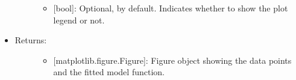\documentclass[letterpaper,10pt,english]{sphinxmanual}
\begin{document}
\begin{fulllineitems}
\begin{fulllineitems}
\begin{itemize}
\begin{description}
\begin{itemize}
\item {} 
 {[}bool{]}: Optional,  by default. Indicates
whether to show the plot legend or not.

\end{itemize}

\end{description}

\item {} \begin{description}
\item[{Returns:}] \leavevmode\begin{itemize}
\item {} 
{[}matplotlib.figure.Figure{]}: Figure object showing the data
points and the fitted model function.

\end{itemize}

\end{description}

\end{itemize}

\end{fulllineitems}


\end{fulllineitems}

\end{document}
